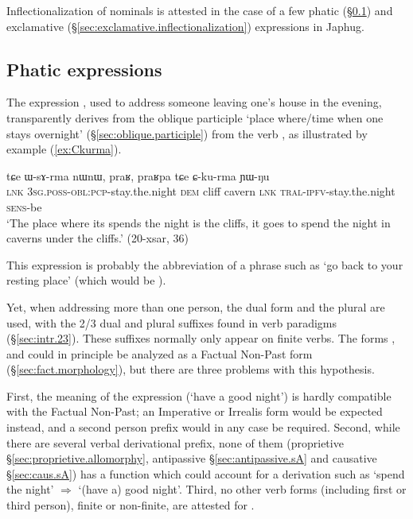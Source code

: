 Inflectionalization of nominals is attested in the case of a few phatic  (§\ref{sec:phatic.inflectionalization}) and exclamative (§\ref{sec:exclamative.inflectionalization}) expressions in Japhug.

\subsection{Phatic expressions} \label{sec:phatic.inflectionalization}
The  expression , used to address someone leaving one's house in the evening, transparently derives from the oblique participle  `place where/time when one stays overnight' (§\ref{sec:oblique.participle}) from the verb , as illustrated by example (\ref{ex:Ckurma}).  

\begin{exe}
\ex \label{ex:Ckurma}
\gll tɕe ɯ-sɤ-rma nɯnɯ, praʁ, praʁpa tɕe ɕ-ku-rma ɲɯ-ŋu \\
\textsc{lnk} \textsc{3sg}.\textsc{poss}-\textsc{obl}:\textsc{pcp}-stay.the.night \textsc{dem} cliff cavern \textsc{lnk} \textsc{tral}-\textsc{ipfv}-stay.the.night \textsc{sens}-be \\
\glt `The place where its spends the night is the cliffs, it goes to spend the night in caverns under the cliffs.' (20-xsar, 36)
\end{exe}

This expression is probably the abbreviation of a phrase such as `go back to your resting place' (which would be ).

Yet, when addressing more than one person, the dual form   and the plural   are used, with the 2/3 dual  and plural  suffixes found in verb paradigms (§\ref{sec:intr.23}). These suffixes normally only appear on finite verbs. The forms ,  and  could in principle be analyzed as a Factual Non-Past form (§\ref{sec:fact.morphology}), but there are three problems with this hypothesis. 

First, the meaning of the expression (`have a good night') is hardly compatible with the Factual Non-Past; an Imperative or Irrealis form would be expected instead, and a second person prefix  would in any case be required. Second, while there are several  verbal derivational prefix, none of them (proprietive §\ref{sec:proprietive.allomorphy}, antipassive §\ref{sec:antipassive.sA} and causative §\ref{sec:caus.sA}) has a function which could account for a derivation such as `spend the night' $\Rightarrow$ `(have a) good night'. Third, no other verb forms (including first or third person), finite or non-finite, are attested for . 

